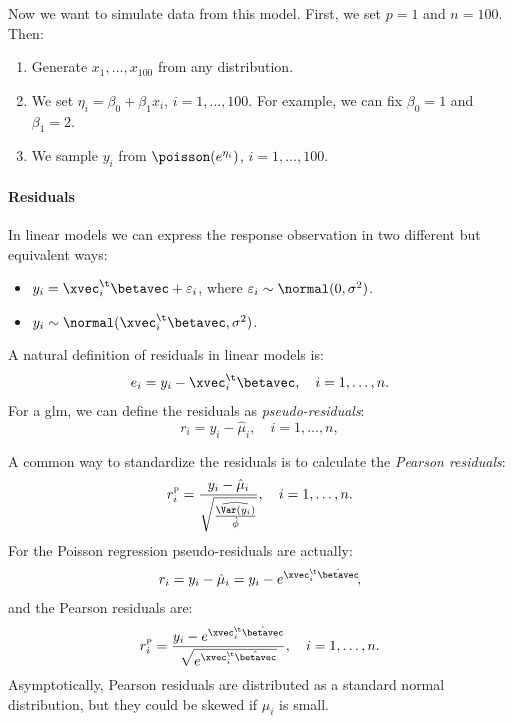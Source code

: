 Now we want to simulate data from this model. First, we set $p = 1$ and $n = 100$. Then:
\begin{enumerate}[beginpenalty=10000]
    \item Generate $x_1, \ldots, x_{100}$ from any distribution.
    \item We set $\eta_i = \beta_0 + \beta_1 x_i$, $i = 1, \ldots, 100$. For example, we can fix $\beta_0 = 1$ and $\beta_1 = 2$.
    \item We sample $y_i$ from $\poisson(e^{\eta_i})$, $i = 1, \ldots, 100$.
\end{enumerate}

\paragraph{Residuals}

In linear models we can express the response observation in two different but equivalent ways:
\begin{itemize}
    \item $y_i = \xvec_i^\t\betavec + \varepsilon_i$, where $\varepsilon_i \sim \normal(0, \sigma^2)$.
    \item $y_i \sim \normal(\xvec_i^\t\betavec, \sigma^2)$.
\end{itemize}

A natural definition of residuals in linear models is:
\begin{equation}
    e_i = y_i - \xvec_i^\t\betavec, \quad i = 1, \ldots, n.
\end{equation}
For a \acs{glm}, we can define the residuals as \emph{pseudo-residuals}:
\begin{equation}
    r_i = y_i - \hat{\mu}_i, \quad i = 1, \ldots, n,
\end{equation}

A common way to standardize the residuals is to calculate the \emph{Pearson residuals}:
\begin{equation}
    r_i^\textsc{p} = \frac{y_i - \hat{\mu}_i}{\sqrt{\frac{\widehat{\Var(y_i)}}{\hat{\phi}}}}, \quad i = 1, \ldots, n.
\end{equation}
For the Poisson regression pseudo-residuals are actually:
\begin{equation}
    r_i = y_i - \hat{\mu}_i = y_i - e^{\xvec_i^\t\hat{\betavec}}\negthinspace,
\end{equation}
and the Pearson residuals are:
\begin{equation}
    r_i^\textsc{p} = \frac{y_i - e^{\xvec_i^\t\hat{\betavec}}}{\sqrt{e^{\xvec_i^\t\hat{\betavec}}}}, \quad i = 1, \ldots, n.
\end{equation}
Asymptotically, Pearson residuals are distributed as a standard normal distribution, but they could be skewed if $\hat{\mu}_i$ is small.

